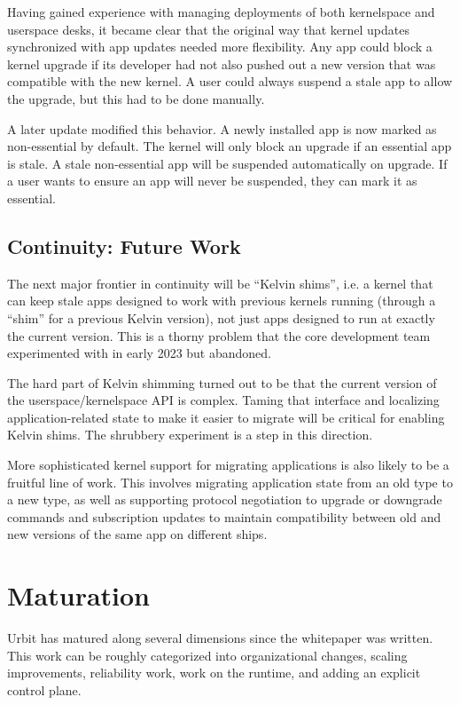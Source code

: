 \documentclass[twoside]{article}
\begin{document}
Having gained experience with managing deployments of both kernelspace and userspace desks, it became clear that the original way that kernel updates synchronized with app updates needed more flexibility.  Any app could block a kernel upgrade if its developer had not also pushed out a new version that was compatible with the new kernel.  A user could always suspend a stale app to allow the upgrade, but this had to be done manually.

A later update modified this behavior.  A newly installed app is now marked as non-essential by default.  The kernel will only block an upgrade if an essential app is stale. A stale non-essential app will be suspended automatically on upgrade.  If a user wants to ensure an app will never be suspended, they can mark it as essential.

\subsection{Continuity: Future Work}

The next major frontier in continuity will be ``Kelvin shims'', i.e. a kernel that can keep stale apps designed to work with previous kernels running (through a ``shim'' for a previous Kelvin version), not just apps designed to run at exactly the current version.  This is a thorny problem that the core development team experimented with in early 2023 but abandoned.

The hard part of Kelvin shimming turned out to be that the current version of the userspace/kernelspace API is complex.  Taming that interface and localizing application-related state to make it easier to migrate will be critical for enabling Kelvin shims.  The shrubbery experiment is a step in this direction.

More sophisticated kernel support for migrating applications is also likely to be a fruitful line of work.  This involves migrating application state from an old type to a new type, as well as supporting protocol negotiation to upgrade or downgrade commands and subscription updates to maintain compatibility between old and new versions of the same app on different ships.

\section{Maturation}

Urbit has matured along several dimensions since the whitepaper was written.  This work can be roughly categorized into organizational changes, scaling improvements, reliability work, work on the runtime, and adding an explicit control plane.
\end{document}
